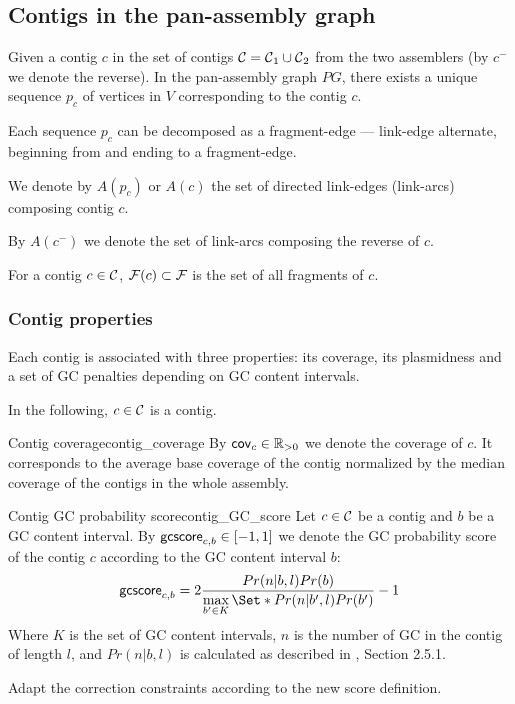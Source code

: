 \subsection{Contigs in the pan-assembly graph}

Given a contig \(c\) in the set of contigs \(\mathcal{C}{} = \mathcal{C}{}_1 \cup \mathcal{C}{}_2\) from the two assemblers (by \(c^-\) we denote the reverse).
In the pan-assembly graph \(PG\), there exists a unique sequence \(p_c\) of vertices in \(V\) corresponding to the contig \(c\).

\begin{notebox}
  Each sequence \(p_c\) can be decomposed as a fragment-edge --- link-edge alternate, beginning from and ending to a fragment-edge.
\end{notebox}

We denote by \(A(p_c)\) or \(A(c)\) the set of directed link-edges (link-arcs) composing contig \(c\).

\begin{notebox}
  By \(A(c^-)\) we denote the set of link-arcs composing the reverse of \(c\).
\end{notebox}

For a contig \(c \in \mathcal{C}{}\), \(\mathcal{F}{}(c) \subset \mathcal{F}{}\) is the set of all fragments of \(c\).

\subsubsection{Contig properties}

Each contig is associated with three properties: its coverage, its plasmidness and a set of GC penalties depending on GC content intervals.

In the following, \(c \in \mathcal{C}{}\) is a contig.

\begin{definition}{Contig coverage}{contig_coverage}
    By \(\mathsf{cov}_{c} \in \mathbb{R}_{>0}\) we denote the coverage of \(c\).
    It corresponds to the average base coverage of the contig normalized by the median coverage of the contigs in the whole assembly.
\end{definition}

\begin{definition}{Contig GC probability score}{contig_GC_score}
    Let \(c \in \mathcal{C}{}\) be a contig and \(b\) be a GC content interval.
    By \(\mathsf{gcscore}_{c, b} \in [-1, 1]\) we denote the GC probability score of the contig \(c\) according to the GC content interval \(b\):
    \[
    \gcscore{c}{b} = 2 \frac{Pr(n|b,l)Pr(b)}{\max\limits_{b' \in K}\Set*{Pr(n|b',l)Pr(b')}} - 1
    \]
    Where \(K\) is the set of GC content intervals, \(n\) is the number of GC in the contig of length \(l\), and \(Pr(n|b,l)\) is calculated as described in \cite{manePlasBinflowFlowbasedMILP2023}, Section 2.5.1.

      \begin{fixmebox}
        Adapt the correction constraints according to the new score definition.
    \end{fixmebox}
\end{definition}

